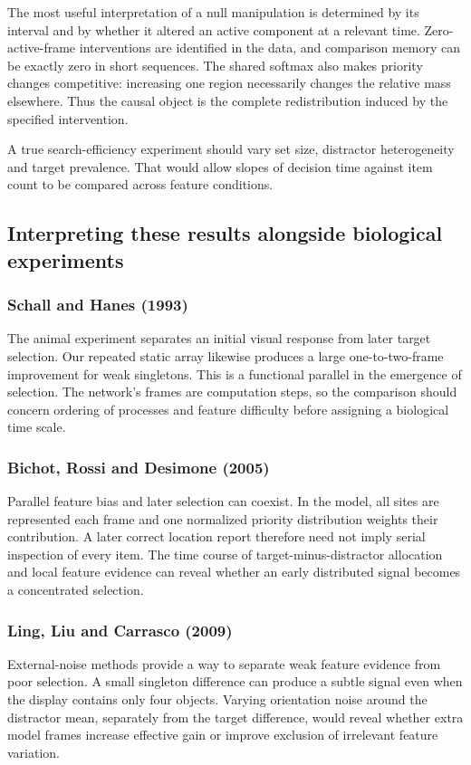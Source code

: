 \documentclass[11pt]{article}
\begin{document}
The most useful interpretation of a null manipulation is determined by its interval and by whether it altered an active component at a relevant time. Zero-active-frame interventions are identified in the data, and comparison memory can be exactly zero in short sequences. The shared softmax also makes priority changes competitive: increasing one region necessarily changes the relative mass elsewhere. Thus the causal object is the complete redistribution induced by the specified intervention.

A true search-efficiency experiment should vary set size, distractor heterogeneity and target prevalence. That would allow slopes of decision time against item count to be compared across feature conditions.

\subsection{Interpreting these results alongside biological experiments}
\subsubsection{Schall and Hanes (1993)}
The animal experiment separates an initial visual response from later target selection. Our repeated static array likewise produces a large one-to-two-frame improvement for weak singletons. This is a functional parallel in the emergence of selection. The network’s frames are computation steps, so the comparison should concern ordering of processes and feature difficulty before assigning a biological time scale. \cite{bio_schall}

\subsubsection{Bichot, Rossi and Desimone (2005)}
Parallel feature bias and later selection can coexist. In the model, all sites are represented each frame and one normalized priority distribution weights their contribution. A later correct location report therefore need not imply serial inspection of every item. The time course of target-minus-distractor allocation and local feature evidence can reveal whether an early distributed signal becomes a concentrated selection. \cite{bio_bichot}

\subsubsection{Ling, Liu and Carrasco (2009)}
External-noise methods provide a way to separate weak feature evidence from poor selection. A small singleton difference can produce a subtle signal even when the display contains only four objects. Varying orientation noise around the distractor mean, separately from the target difference, would reveal whether extra model frames increase effective gain or improve exclusion of irrelevant feature variation. \cite{bio_ling}
\end{document}
